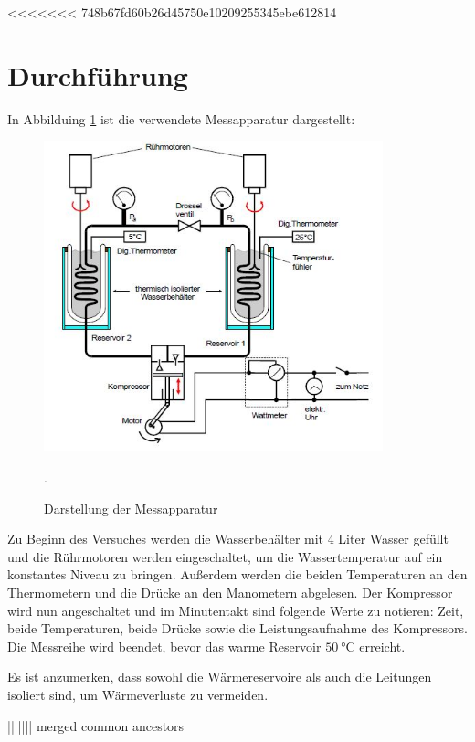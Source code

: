 <<<<<<< 748b67fd60b26d45750e10209255345ebe612814
\section{Durchführung}
In Abbilduing \ref{fig:pumpe2} ist die verwendete Messapparatur dargestellt:
\begin{figure}[H]
  \centering
  \includegraphics[height=9cm]{pumpe2.JPG}
  \caption{Darstellung der Messapparatur}
  \cite{skript}.
  \label{fig:pumpe2}
\end{figure}

Zu Beginn des Versuches werden die Wasserbehälter mit 4 Liter Wasser gefüllt und
die Rührmotoren werden eingeschaltet, um die Wassertemperatur auf ein konstantes
Niveau zu bringen. Außerdem werden die beiden Temperaturen an den Thermometern und die Drücke an den Manometern abgelesen.
Der Kompressor wird nun angeschaltet und im Minutentakt sind folgende Werte zu notieren:
Zeit, beide Temperaturen, beide Drücke sowie die Leistungsaufnahme des Kompressors.
Die Messreihe wird beendet, bevor das warme Reservoir $\SI{50}{\celsius}$ erreicht.

Es ist anzumerken, dass sowohl die Wärmereservoire als auch die Leitungen isoliert sind,
um Wärmeverluste zu vermeiden.


\label{sec:Durchführung}
||||||| merged common ancestors
